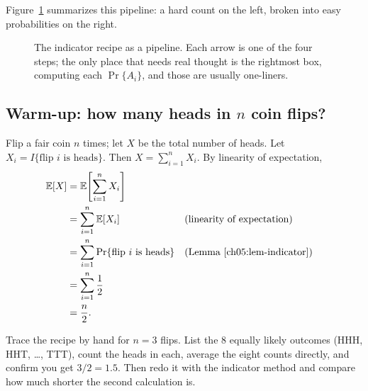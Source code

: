 Figure~\ref{ch05:fig-recipe} summarizes this pipeline: a hard count on
the left, broken into easy probabilities on the right.

\begin{figure}[htbp]
\centering
{}
\caption{The indicator recipe as a pipeline. Each arrow is one of the four steps;
the only place that needs real thought is the rightmost box, computing each
$\Pr\{A_i\}$, and those are usually one-liners.}
\label{ch05:fig-recipe}
\end{figure}

\subsection*{Warm-up: how many heads in $n$ coin flips?}

Flip a fair coin $n$ times; let $X$ be the total number of heads. Let $X_i = I\{\text{flip } i \text{ is heads}\}$. Then $X = \sum_{i=1}^n X_i$. By linearity of expectation,
\begin{align*}
  \mathbb{E}[X] &= \mathbb{E}\!\left[\sum_{i=1}^n X_i\right] \\
        &= \sum_{i=1}^n \mathbb{E}[X_i] && \text{(linearity of expectation)} \\
        &= \sum_{i=1}^n \Pr\{\text{flip } i \text{ is heads}\} && \text{(Lemma~\ref{ch05:lem-indicator})} \\
        &= \sum_{i=1}^n \frac{1}{2} \\
        &= \frac{n}{2}.
\end{align*}

\begin{labbox}
Trace the recipe by hand for $n = 3$ flips. List the $8$ equally likely outcomes
(HHH, HHT, \dots, TTT), count the heads in each, average the eight counts
directly, and confirm you get $3/2 = 1.5$. Then redo it with the indicator
method and compare how much shorter the second calculation is.
\end{labbox}

